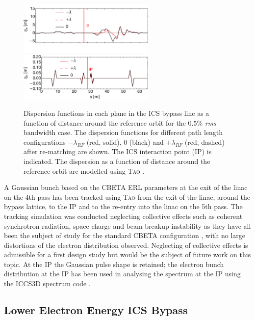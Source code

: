 \documentclass[../main.tex]{subfiles}
\begin{document}
\begin{figure}[!h]
\centering
\includegraphics[width=0.6\textwidth]{Figures/CBETA_Inverse_Compton_Source_Design/dispplotx.pdf}
\includegraphics[width=0.6\textwidth]{Figures/CBETA_Inverse_Compton_Source_Design/dispploty.pdf}
\caption{Dispersion functions in each plane in the ICS bypass line as a function of distance around the reference orbit for the 0.5\% \textit{rms} bandwidth case. The dispersion functions for different path length configurations $-\lambda_{RF}$ (red, solid), $0$ (black) and $+\lambda_{RF}$ (red, dashed) after re-matching are shown. The ICS interaction point (IP) is indicated. The dispersion as a function of distance around the reference orbit are modelled using \textsc{Tao} \cite{TaoManual}.}
\label{fig:CBETA_ICS_dispersion}
\end{figure}
A Gaussian bunch based on the CBETA ERL parameters at the exit of the linac on the 4th pass has been tracked using \textsc{Tao} \cite{TaoManual} from the exit of the linac, around the bypass lattice, to the IP and to the re-entry into the linac on the 5th pass. The tracking simulation was conducted neglecting collective effects such as coherent synchrotron radiation, space charge and beam breakup instability as they have all been the subject of study for the standard CBETA configuration \cite{hoffstaetter2017cbeta,lou2019beam,lou2020coherent}, with no large distortions of the electron distribution observed. Neglecting of collective effects is admissible for a first design study but would be the subject of future work on this topic. At the IP the Gaussian pulse shape is retained; the electron bunch distribution at the IP has been used in analysing the spectrum at the IP using the \textsc{ICCS3D} spectrum code \cite{krafft2016laser,ranjan2018simulation}.   

\subsection{Lower Electron Energy ICS Bypass}
\end{document}
